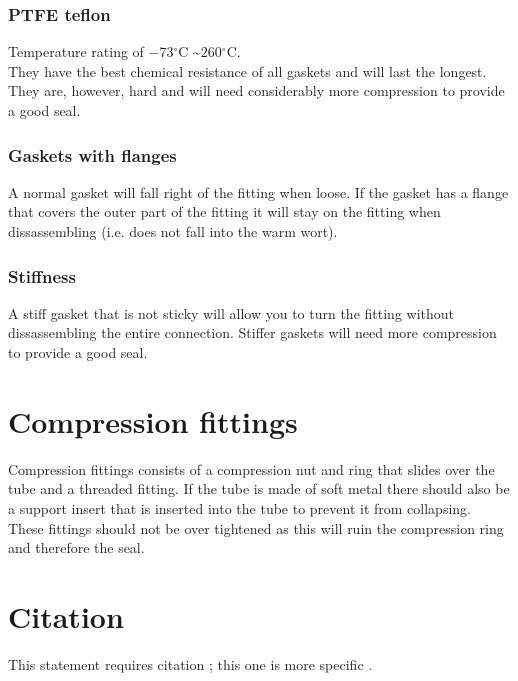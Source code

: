 \documentclass[11pt,fleqn]{book} %
\newcommand{\degree}{\ensuremath{^\circ}}
\begin{document}
\subsubsection{PTFE teflon}

Temperature rating of $-73\degree$C \textasciitilde $260\degree$C.\\
They have the best chemical resistance of all gaskets and will last the longest. They are, however, hard and will need considerably more compression to provide a good seal.

\subsubsection{Gaskets with flanges}

A normal gasket will fall right of the fitting when loose. If the gasket has a flange that covers the outer part of the fitting it will stay on the fitting when dissassembling (i.e. does not fall into the warm wort).

\subsubsection{Stiffness}

A stiff gasket that is not sticky will allow you to turn the fitting without dissassembling the entire connection. Stiffer gaskets will need more compression to provide a good seal.

\section{Compression fittings}

Compression fittings consists of a compression nut and ring that slides over the tube and a threaded fitting. If the tube is made of soft metal there should also be a support insert that is inserted into the tube to prevent it from collapsing.\\
These fittings should not be over tightened as this will ruin the compression ring and therefore the seal.


\section{Citation}

This statement requires citation \cite{book_key}; this one is more specific \cite[122]{article_key}.
\end{document}
